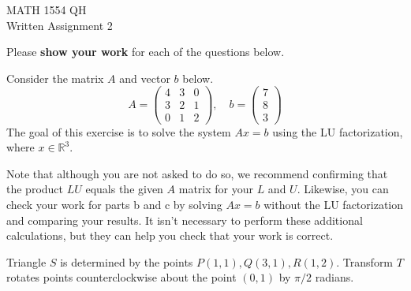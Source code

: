 \documentclass[11pt]{exam}
\begin{document}
\begin{center}
    \Large MATH 1554 QH \\[2pt] Written Assignment 2
\end{center}
\thispagestyle{empty} %

    
\noindent Please \textbf{show your work} for each of the questions below.

\begin{questions}

    \question[5] Consider the matrix $A$ and vector $b$ below.
    $$A = \begin{pmatrix} 4&3&0\\3&2&1\\0&1&2 \end{pmatrix}, \quad b = \begin{pmatrix} 7\\8\\3\end{pmatrix}$$
    The goal of this exercise is to solve the system $Ax=b$ using the LU factorization, where $x \in \mathbb R^3$.
    
    Note that although you are not asked to do so, we recommend confirming that the product $LU$ equals the given $A$ matrix for your $L$ and $U$. Likewise, you can check your work for parts b and c by solving $Ax=b$ without the LU factorization and comparing your results. It isn't necessary to perform these additional calculations, but they can help you check that your work is correct. 

    \question[5] Triangle $S$ is determined by the points $P(1,1), Q(3,1), R(1,2)$. Transform $T$ rotates points counterclockwise about the point $(0,1)$ by $\pi/2$ radians. 
    \begin{parts}

\end{parts}
\end{questions}
\end{document}
